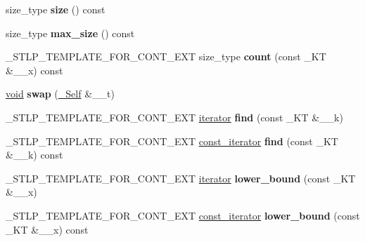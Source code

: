 \begin{DoxyCompactItemize}
size\+\_\+type {\bfseries size} () const
\item 
\mbox{\label{class___rb__tree_aed335a7da1ab20f4194cefaca4525ae2}} 
size\+\_\+type {\bfseries max\+\_\+size} () const
\item 
\mbox{\label{class___rb__tree_a504ae60eaffe045a9a33d7b537e0d396}} 
\+\_\+\+S\+T\+L\+P\+\_\+\+T\+E\+M\+P\+L\+A\+T\+E\+\_\+\+F\+O\+R\+\_\+\+C\+O\+N\+T\+\_\+\+E\+XT size\+\_\+type {\bfseries count} (const \+\_\+\+KT \&\+\_\+\+\_\+x) const
\item 
\mbox{\label{class___rb__tree_a50abd1f75a8b605ae1dd9b71ea57f17d}} 
\hyperlink{interfacevoid}{void} {\bfseries swap} (\hyperlink{class___rb__tree}{\+\_\+\+Self} \&\+\_\+\+\_\+t)
\item 
\mbox{\label{class___rb__tree_a3714dcaf12c53e2b4b4a847c519090cd}} 
\+\_\+\+S\+T\+L\+P\+\_\+\+T\+E\+M\+P\+L\+A\+T\+E\+\_\+\+F\+O\+R\+\_\+\+C\+O\+N\+T\+\_\+\+E\+XT \hyperlink{struct___rb__tree__iterator}{iterator} {\bfseries find} (const \+\_\+\+KT \&\+\_\+\+\_\+k)
\item 
\mbox{\label{class___rb__tree_a5bf5224e2d3a3286161fb132329d12b6}} 
\+\_\+\+S\+T\+L\+P\+\_\+\+T\+E\+M\+P\+L\+A\+T\+E\+\_\+\+F\+O\+R\+\_\+\+C\+O\+N\+T\+\_\+\+E\+XT \hyperlink{struct___rb__tree__iterator}{const\+\_\+iterator} {\bfseries find} (const \+\_\+\+KT \&\+\_\+\+\_\+k) const
\item 
\mbox{\label{class___rb__tree_a036f51cdd0a00c3296335338508ecb10}} 
\+\_\+\+S\+T\+L\+P\+\_\+\+T\+E\+M\+P\+L\+A\+T\+E\+\_\+\+F\+O\+R\+\_\+\+C\+O\+N\+T\+\_\+\+E\+XT \hyperlink{struct___rb__tree__iterator}{iterator} {\bfseries lower\+\_\+bound} (const \+\_\+\+KT \&\+\_\+\+\_\+x)
\item 
\mbox{\label{class___rb__tree_a0282d9c49edc5330ceb352cdf0cfb0e1}} 
\+\_\+\+S\+T\+L\+P\+\_\+\+T\+E\+M\+P\+L\+A\+T\+E\+\_\+\+F\+O\+R\+\_\+\+C\+O\+N\+T\+\_\+\+E\+XT \hyperlink{struct___rb__tree__iterator}{const\+\_\+iterator} {\bfseries lower\+\_\+bound} (const \+\_\+\+KT \&\+\_\+\+\_\+x) const
\item 
\mbox{\label{class___rb__tree_a6924090c59ac58fc25279c31b6413282}} 

\end{DoxyCompactItemize}
